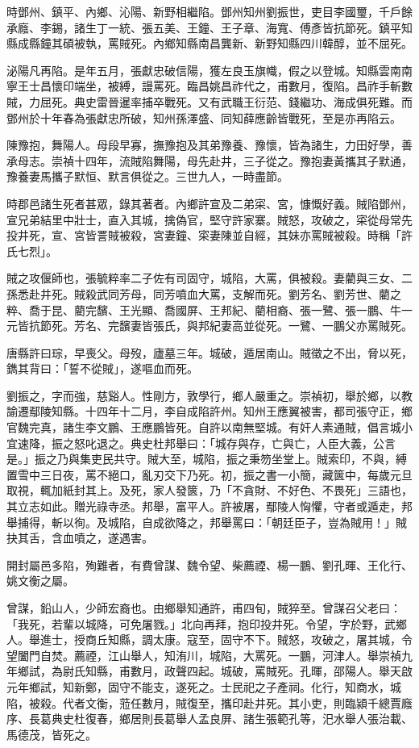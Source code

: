 \begin{pinyinscope}
時鄧州、鎮平、內鄉、沁陽、新野相繼陷。鄧州知州劉振世，吏目李國璽，千戶餘承廕、李錫，諸生丁一統、張五美、王鐘、王子章、海寬、傅彥皆抗節死。鎮平知縣成縣鐘其碩被執，罵賊死。內鄉知縣南昌龔新、新野知縣四川韓醇，並不屈死。

泌陽凡再陷。是年五月，張獻忠破信陽，獲左良玉旗幟，假之以登城。知縣雲南南寧王士昌懷印端坐，被縛，謾罵死。臨昌姚昌祚代之，甫數月，復陷。昌祚手斬數賊，力屈死。典史雷晉暹率捕卒戰死。又有武職王衍范、錢繼功、海成俱死難。而鄧州於十年春為張獻忠所破，知州孫澤盛、同知薛應齡皆戰死，至是亦再陷云。

陳豫抱，舞陽人。母段早寡，撫豫抱及其弟豫養、豫懷，皆為諸生，力田好學，善承母志。崇禎十四年，流賊陷舞陽，母先赴井，三子從之。豫抱妻黃攜其子默通，豫養妻馬攜子默恒、默言俱從之。三世九人，一時盡節。

時郡邑諸生死者甚眾，錄其著者。內鄉許宣及二弟寀、宮，慷慨好義。賊陷鄧州，宣兄弟結里中壯士，直入其城，擒偽官，堅守許家寨。賊怒，攻破之，寀從母常先投井死，宣、宮皆詈賊被殺，宮妻鐘、寀妻陳並自經，其妹亦罵賊被殺。時稱「許氏七烈」。

賊之攻偃師也，張毓粹率二子佐有司固守，城陷，大罵，俱被殺。妻藺與三女、二孫悉赴井死。賊殺武同芳母，同芳噴血大罵，支解而死。劉芳名、劉芳世、藺之粹、喬于昆、藺完馪、王光顯、喬國屏、王邦紀、藺相裔、張一鷺、張一鵬、牛一元皆抗節死。芳名、完馪妻皆張氏，與邦紀妻高並從死。一鷺、一鵬父亦罵賊死。

唐縣許曰琮，早喪父。母歿，廬墓三年。城破，遁居南山。賊徵之不出，脅以死，鐫其背曰：「誓不從賊」，遂嘔血而死。

劉振之，字而強，慈谿人。性剛方，敦學行，鄉人嚴重之。崇禎初，舉於鄉，以教諭遷鄢陵知縣。十四年十二月，李自成陷許州。知州王應翼被害，都司張守正，鄉官魏完真，諸生李文鵬、王應鵬皆死。自許以南無堅城。有奸人素通賊，倡言城小宜速降，振之怒叱退之。典史杜邦舉曰：「城存與存，亡與亡，人臣大義，公言是。」振之乃與集吏民共守。賊大至，城陷，振之秉笏坐堂上。賊索印，不與，縛置雪中三日夜，罵不絕口，亂刃交下乃死。初，振之書一小簡，藏篋中，每歲元旦取視，輒加紙封其上。及死，家人發篋，乃「不貪財、不好色、不畏死」三語也，其立志如此。贈光祿寺丞。邦舉，富平人。許被屠，鄢陵人恟懼，守者或遁走，邦舉捕得，斬以徇。及城陷，自成欲降之，邦舉罵曰：「朝廷臣子，豈為賊用！」賊抉其舌，含血噴之，遂遇害。

開封屬邑多陷，殉難者，有費曾謀、魏令望、柴薦禋、楊一鵬、劉孔暉、王化行、姚文衡之屬。

曾謀，鉛山人，少師宏裔也。由鄉舉知通許，甫四旬，賊猝至。曾謀召父老曰：「我死，若輩以城降，可免屠戮。」北向再拜，抱印投井死。令望，字於野，武鄉人。舉進士，授商丘知縣，調太康。寇至，固守不下。賊怒，攻破之，屠其城，令望闔門自焚。薦禋，江山舉人，知洧川，城陷，大罵死。一鵬，河津人。舉崇禎九年鄉試，為尉氏知縣，甫數月，政聲四起。城破，罵賊死。孔暉，邵陽人。舉天啟元年鄉試，知新鄭，固守不能支，遂死之。士民祀之子產祠。化行，知商水，城陷，被殺。代者文衡，蒞任數月，賊復至，攜印赴井死。其小吏，則臨潁千總賈廕序、長葛典史杜復春，鄉居則長葛舉人孟良屏、諸生張範孔等，汜水舉人張治載、馬德茂，皆死之。


\end{pinyinscope}
